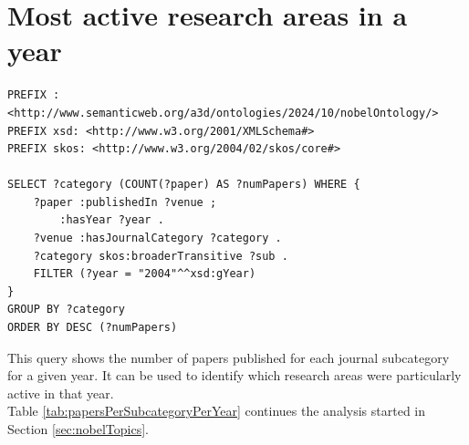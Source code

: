 \documentclass{article}
\begin{document}
\section{Most active research areas in a year} \label{moreActiveResearchAreas}
\begin{lstlisting}
PREFIX : <http://www.semanticweb.org/a3d/ontologies/2024/10/nobelOntology/>
PREFIX xsd: <http://www.w3.org/2001/XMLSchema#>
PREFIX skos: <http://www.w3.org/2004/02/skos/core#>

SELECT ?category (COUNT(?paper) AS ?numPapers) WHERE {
    ?paper :publishedIn ?venue ;
        :hasYear ?year .
    ?venue :hasJournalCategory ?category .
    ?category skos:broaderTransitive ?sub .
    FILTER (?year = "2004"^^xsd:gYear)
}
GROUP BY ?category
ORDER BY DESC (?numPapers)
\end{lstlisting}

\vspace{1em}

This query shows the number of papers published for each journal subcategory for a given year.
It can be used to identify which research areas were particularly active in that year.\\

Table \ref{tab:papersPerSubcategoryPerYear} continues the analysis started in Section \ref{sec:nobelTopics}.
\end{document}
